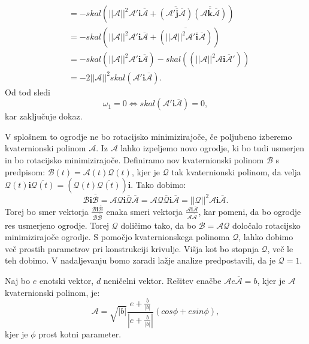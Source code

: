 \documentclass[mat1]{fmfdelo}
\newcommand{\ii}{\boldsymbol i}
\newcommand{\jj}{\boldsymbol j}
\newcommand{\kk}{\boldsymbol k}
\newcommand{\A}{\mathcal A}
\newcommand{\B}{\mathcal B}
\newcommand{\QQ}{\mathcal Q}
\begin{document}
\begin{dokaz}
\begin{equation*}
\begin{split}
	&= -skal \left( ||\A||^2 \A' \ii \overline{\A}+ \overline{\left(\A' \overline{\jj} \overline{\A}\right)} \overline{ \left( \A \overline{\kk} \overline{\A} \right) }\right) \\
	&= -skal \left( ||\A||^2 \A' \ii \overline{\A}+ \overline{\left( ||\A||^2 \A' \overline{\ii} \overline{\A}\right)} \right) \\
	&= -skal \left( ||\A||^2 \A' \ii \overline{\A} \right)-skal \left(\left( ||\A||^2 \A \ii \overline{\A}'\right) \right) \\
	&= -2||\A||^2 skal \left( \A' \ii \overline{\A}\right).
\end{split}
\end{equation*}
Od tod sledi
\begin{equation*}
\omega_1 = 0 \Leftrightarrow skal \left( \A' \ii \overline{\A} \right) = 0,
\end{equation*}
kar zaključuje dokaz.
\end{dokaz}
\begin{opomba}{\label{aq}}
V splošnem to ogrodje ne bo rotacijsko minimizirajoče, če poljubeno izberemo kvaternionski polinom $\A$. Iz $\A$ lahko izpeljemo novo ogrodje, ki bo tudi usmerjen in bo rotacijsko minimizirajoče. Definiramo nov kvaternionski polinom $\B$ s predpisom: $\B(t) = \A(t) \QQ(t)$, kjer je $\QQ$ tak kvaternionski polinom, da velja $\QQ(t) \ii \overline{\QQ(t)} = \left( \QQ(t) \overline{\QQ(t)} \right) \ii$. Tako dobimo:
\begin{equation*}
	\B \ii \overline{\B} = \A \QQ \ii \overline{\QQ} \overline{\A} = \A \QQ \overline{\QQ} \ii \overline{\A} = ||\QQ||^2\A\ii\overline{\A}.
\end{equation*}
Torej bo smer vektorja $\frac{\B \ii \overline{\B}}{\B  \overline{\B}}$ enaka smeri vektorja $\frac{\A \ii \overline{\A}}{\A  \overline{\A}}$, kar pomeni, da bo ogrodje res usmerjeno ogrodje. Torej $\QQ$ doličimo tako, da bo $\B = \A\QQ$ določalo rotacijsko minimizirajoče ogrodje. S pomočjo kvaternionskega polinoma $\QQ$, lahko dobimo več prostih parametrov pri konstrukciji krivulje. Višja kot bo stopnja $\QQ$, več le teh dobimo. V nadaljevanju bomo zaradi lažje analize predpostavili, da je $\QQ=1$.
\end{opomba}

\iffalse

\begin{izrek}
Naj bo $e$ enotski vektor, $d$ neničelni vektor. Rešitev enačbe $\A e \overline{\A} = b$, kjer je $\A$ kvaternionski polinom, je:
\begin{equation*}
	\A = \sqrt{|b|} \frac{e+\frac{b}{|b|}}{|e+\frac{b}{|b|}|} \left( cos \phi + e sin\phi \right),
\end{equation*}
kjer je $\phi$ prost kotni parameter.
\end{izrek}
\end{document}
